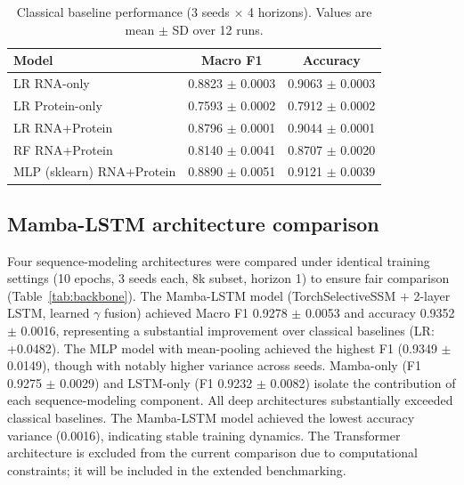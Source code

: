 \documentclass[11pt,twocolumn]{article}
\begin{document}
\begin{table}[tbp]
\centering
\caption{Classical baseline performance (3 seeds $\times$ 4 horizons). Values are mean $\pm$ SD over 12 runs.}
\label{tab:baselines}
\footnotesize
\setlength{\tabcolsep}{3pt}
\renewcommand{\arraystretch}{1.08}
\begin{tabularx}{\columnwidth}{@{}>{\raggedright\arraybackslash}Xcc@{}}
\toprule
\textbf{Model} & \textbf{Macro F1} & \textbf{Accuracy} \\
\midrule
LR RNA-only & 0.8823 $\pm$ 0.0003 & 0.9063 $\pm$ 0.0003 \\
LR Protein-only & 0.7593 $\pm$ 0.0002 & 0.7912 $\pm$ 0.0002 \\
LR RNA+Protein & 0.8796 $\pm$ 0.0001 & 0.9044 $\pm$ 0.0001 \\
RF RNA+Protein & 0.8140 $\pm$ 0.0041 & 0.8707 $\pm$ 0.0020 \\
MLP (sklearn) RNA+Protein & 0.8890 $\pm$ 0.0051 & 0.9121 $\pm$ 0.0039 \\
\bottomrule
\end{tabularx}
\end{table}

\subsection{Mamba-LSTM architecture comparison}

Four sequence-modeling architectures were compared under identical training settings (10 epochs, 3 seeds each, 8k subset, horizon 1) to ensure fair comparison (Table~\ref{tab:backbone}). The Mamba-LSTM model (TorchSelectiveSSM + 2-layer LSTM, learned $\gamma$ fusion) achieved Macro F1 0.9278 $\pm$ 0.0053 and accuracy 0.9352 $\pm$ 0.0016, representing a substantial improvement over classical baselines (LR: +0.0482). The MLP model with mean-pooling achieved the highest F1 (0.9349 $\pm$ 0.0149), though with notably higher variance across seeds. Mamba-only (F1 0.9275 $\pm$ 0.0029) and LSTM-only (F1 0.9232 $\pm$ 0.0082) isolate the contribution of each sequence-modeling component. All deep architectures substantially exceeded classical baselines. The Mamba-LSTM model achieved the lowest accuracy variance (0.0016), indicating stable training dynamics. The Transformer architecture is excluded from the current comparison due to computational constraints; it will be included in the extended benchmarking.
\end{document}
